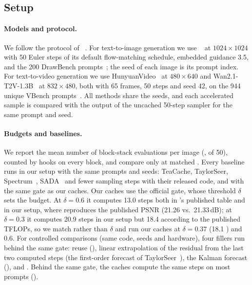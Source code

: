 
\subsection{Setup}
\label{sec:setup}

\paragraph{Models and protocol.}
We follow the protocol of \seacache~\cite{chung2026seacache}. For text-to-image generation we use
\flux~\cite{blackforestlabs2024flux} at $1024{\times}1024$ with 50 Euler steps of its default flow-matching schedule,
embedded guidance 3.5, and the 200 DrawBench prompts~\cite{saharia2022imagen}; the seed of each image is its prompt
index. For text-to-video generation we use HunyuanVideo~\cite{kong2024hunyuanvideo} at $480{\times}640$ and
Wan2.1-T2V-1.3B~\cite{wan2025wan} at $832{\times}480$, both with 65 frames, 50 steps and seed 42, on the 944
unique VBench prompts~\cite{huang2024vbench}. All methods share the seeds, and each accelerated sample is compared with
the output of the uncached 50-step sampler for the same prompt and seed.

\paragraph{Budgets and baselines.}
We report the mean number of block-stack evaluations per image (\nfe, of 50), counted by hooks on every block, and
compare only at matched \nfe. Every baseline runs in our setup with the same prompts and seeds: TeaCache, TaylorSeer,
Spectrum~\cite{han2026spectrum}, SADA~\cite{jiang2025sada} and fewer sampling steps with their released code, and
\seacache with the same gate as our caches. Our caches use the
official \sea gate, whose threshold $\delta$ sets the budget. At $\delta=0.6$ it computes 13.0 steps both in
\seacache's published table and in our setup, where \seacache reproduces the published PSNR (21.26
vs.\ 21.33\,dB); at $\delta=0.3$ it computes 20.9 steps in our setup but 18.4 according to the published TFLOPs, so
we match \nfe rather than $\delta$ and run our caches at $\delta=0.37$ (18.1 \nfe) and $0.6$. For controlled comparisons (same code, seeds and hardware), four fillers run
behind the same gate: reuse (\seacache), linear extrapolation of the residual from the last two computed steps (the
first-order forecast of TaylorSeer~\cite{liu2025taylorseer}), the Kalman forecast (\kalsea), and \ours. Behind the same gate, the
caches compute the same steps on most prompts ().

